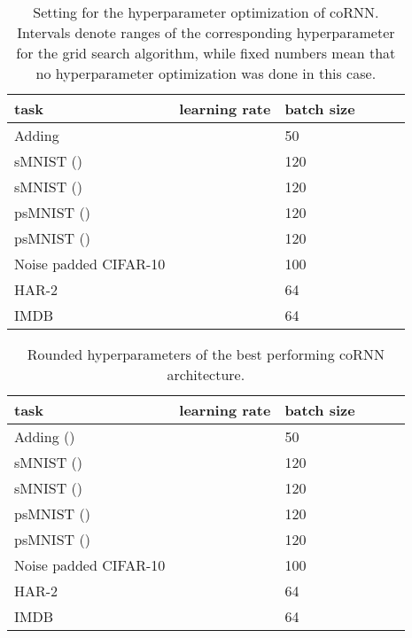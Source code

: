 \documentclass{article} \usepackage{iclr2021_conference,times}
\begin{document}
\begin{table}[h!]
  \caption{Setting for the hyperparameter optimization of coRNN. Intervals denote ranges of the corresponding hyperparameter for the grid search algorithm, while fixed numbers mean that no hyperparameter optimization was done in this case.}
  \label{tab:hyperparameters}
  \centering
  \begin{tabular}{llllll}
    \toprule
    \cmidrule(r){1-6}
    task & learning rate & batch size  &  & 
     &  \\
    \midrule
Adding &  &50&  &  & \\
sMNIST () &  & 120 &  &  &  \\
sMNIST () &  & 120 &    & & \\
psMNIST () &  & 120 &  &  &  \\
psMNIST () &  & 120 &   &  &  \\
Noise padded CIFAR-10 &  & 100 &  &  &  \\
HAR-2 &  & 64 &  &  &  \\
IMDB & & 64  &  &  &  \\
    \bottomrule
  \end{tabular}
\end{table}
\begin{table}[h!]
  \caption{Rounded hyperparameters of the best performing coRNN architecture.}
  \label{tab:hyperparameters_rounded}
  \centering
  \begin{tabular}{llllll}
    \toprule
    \cmidrule(r){1-6}
    task & learning rate & batch size  &  & 
     &  \\
    \midrule
Adding () &  &50&  &  & \\
sMNIST () &  & 120 &  &   & \\
sMNIST () & &  120&  & & \\
psMNIST () & & 120 &  &  &  \\
psMNIST () & & 120 &  &  &  \\
Noise padded CIFAR-10 &  &100&  &  & \\
HAR-2 &  &64&  &  & \\
IMDB &  & 64 & &  & \\
    \bottomrule
  \end{tabular}
\end{table}
\end{document}

